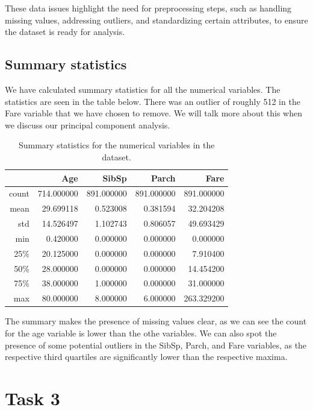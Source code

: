 \documentclass[twoside,11pt]{article}
\begin{document}
These data issues highlight the need for preprocessing steps, such as handling missing values, addressing outliers, and standardizing certain attributes, to ensure the dataset is ready for analysis.

\subsection*{Summary statistics}

We have calculated summary statistics for all the numerical variables. The statistics are seen in the table below. There was an outlier of roughly 512 in the Fare variable that we have chosen to remove. We will talk more about this when we discuss our principal component analysis.

\begin{table}[h]
	\centering
	\begin{tabular}{| r | r | r | r | r |}
		\hline
			  &       Age   &      SibSp  &      Parch  &       Fare\\
		\hline
		count & 714.000000  & 891.000000  & 891.000000  & 891.000000\\
		mean  &  29.699118  &   0.523008  &   0.381594  &  32.204208\\
		std   &  14.526497  &   1.102743  &   0.806057  &  49.693429\\
		min   &   0.420000  &   0.000000  &   0.000000  &   0.000000\\
		25\%  &   20.125000 &   0.000000  &   0.000000  &   7.910400\\
		50\%  &   28.000000 &   0.000000  &   0.000000  &  14.454200\\
		75\%  &   38.000000 &   1.000000  &   0.000000  &  31.000000\\
		max   &  80.000000  &   8.000000  &   6.000000  & 263.329200\\
		\hline
	\end{tabular}
	\caption{Summary statistics for the numerical variables in the dataset.}
	\label{table:summary}
\end{table}

\noindent The summary makes the presence of missing values clear, as we can see the count for the age variable is lower than the othe variables. We can also spot the presence of some potential outliers in the SibSp, Parch, and Fare variables, as the respective third quartiles are significantly lower than the respective maxima.

\section*{Task 3}
\end{document}
